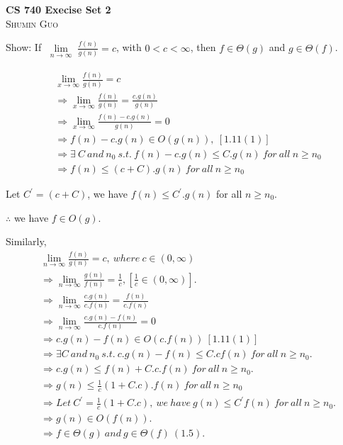 \documentclass{article}
\begin{document}
\begin{center}
\textbf{\Huge{CS 740 Execise Set 2}}\\
\textsc{Shumin Guo}
\end{center}

\begin{enumerate}
  \setcounter{enumi}{3}
\LARGE{\item Show: If $\lim\limits_{\substack{n \to
      \infty}}\frac{f(n)}{g(n)} = c$, with $0<c<\infty$, then $f\in
  \Theta(g)$ and $g\in \Theta(f)$.} 

\large{
\begin{align*}
  & \lim_{x \to \infty}\frac{f(n)}{g(n)} = c \\
  & \Rightarrow \lim_{x \to \infty}\frac{f(n)}{g(n)} = \frac{c.g(n)}{g(n)}  \\
  & \Rightarrow \lim_{x \to \infty}\frac{f(n)-c.g(n)}{g(n)} = 0 \\
  & \Rightarrow f(n)-c.g(n) \in O(g(n)),~[1.11(1)] \\
  & \Rightarrow \exists~ C~ and~ n_0~ s.t.~ f(n)-c.g(n)\le C.g(n)~for~all~
  n\ge n_0 \\
  & \Rightarrow f(n) \le (c+C).g(n)~ for~ all~ n\ge n_0
\end{align*}

Let $C^{\prime} = (c+C)$, we have $f(n) \le C^{\prime}.g(n)$ for all
$n\ge n_0$. 

$\therefore$ we have $f\in O(g)$. 

Similarly, 
\begin{align*}
  & \lim_{n \to \infty}\frac{f(n)}{g(n)} = c,~where~ c\in (0,\infty) \\
  & \Rightarrow \lim_{n \to \infty}\frac{g(n)}{f(n)} = 
  \frac{1}{c},[\frac{1}{c}\in (0, \infty)]. \\
  & \Rightarrow \lim_{n\to \infty}\frac{c.g(n)}{c.f(n)} =
  \frac{f(n)}{c.f(n)} \\
  & \Rightarrow \lim_{n\to \infty}\frac{c.g(n)-f(n)}{c.f(n)} = 0 \\
  & \Rightarrow c.g(n)-f(n)\in O(c.f(n))~ [1.11(1)]\\ 
  & \Rightarrow \exists C~and~n_0~ s.t.~ c.g(n)-f(n)\le
  C.cf(n)~ for~ all~ n\ge n_0. \\
  & \Rightarrow c.g(n) \le f(n) + C.c.f(n)~ for~ all~ n\ge n_0.  \\ 
  & \Rightarrow g(n) \le \frac{1}{c}(1+C.c).f(n)~ for~ all~
  n\ge n_0 \\
  & \Rightarrow Let~ C^{\prime} = \frac{1}{c}(1+C.c),~ we~
  have~ g(n) \le C^{\prime}f(n)~ for~ all~ n\ge n_0. \\
  & \Rightarrow g(n)\in O(f(n)).  \\
  & \Rightarrow f\in \Theta(g)~ and~ g\in \Theta(f)~ (1.5). 
\end{align*}

}
\end{enumerate}
\end{document}
